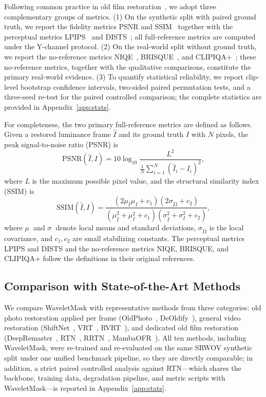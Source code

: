 \documentclass[applsci,article,submit,pdftex,moreauthors]{Definitions/mdpi}
\begin{document}
Following common practice in old film restoration~\cite{rtn2022,rrtn2024,mao2025mambaofr}, we adopt three complementary groups of metrics. (1) On the synthetic split with paired ground truth, we report the fidelity metrics PSNR and SSIM~\cite{wang2004ssim} together with the perceptual metrics LPIPS~\cite{zhang2018lpips} and DISTS~\cite{ding2020dists}; all full-reference metrics are computed under the Y-channel protocol. (2) On the real-world split without ground truth, we report the no-reference metrics NIQE~\cite{mittal2013niqe}, BRISQUE~\cite{mittal2012brisque}, and CLIPIQA+~\cite{wang2023clipiqa}; these no-reference metrics, together with the qualitative comparisons, constitute the primary real-world evidence. (3) To quantify statistical reliability, we report clip-level bootstrap confidence intervals, two-sided paired permutation tests, and a three-seed re-test for the paired controlled comparison; the complete statistics are provided in Appendix~\ref{app:stats}.

For completeness, the two primary full-reference metrics are defined as follows. Given a restored luminance frame $\hat{I}$ and its ground truth $I$ with $N$ pixels, the peak signal-to-noise ratio (PSNR) is
\begin{equation}
\mathrm{PSNR}(\hat{I}, I) = 10\log_{10}\frac{L^{2}}{\frac{1}{N}\sum_{i=1}^{N}(\hat{I}_{i}-I_{i})^{2}},
\end{equation}
where $L$ is the maximum possible pixel value, and the structural similarity index (SSIM) is
\begin{equation}
\mathrm{SSIM}(\hat{I}, I) = \frac{(2\mu_{\hat{I}}\mu_{I}+c_{1})(2\sigma_{\hat{I}I}+c_{2})}{(\mu_{\hat{I}}^{2}+\mu_{I}^{2}+c_{1})(\sigma_{\hat{I}}^{2}+\sigma_{I}^{2}+c_{2})},
\end{equation}
where $\mu_{\cdot}$ and $\sigma_{\cdot}$ denote local means and standard deviations, $\sigma_{\hat{I}I}$ is the local covariance, and $c_{1},c_{2}$ are small stabilizing constants. The perceptual metrics LPIPS and DISTS and the no-reference metrics NIQE, BRISQUE, and CLIPIQA+ follow the definitions in their original references.

\subsection{Comparison with State-of-the-Art Methods}\label{subsec:sota}

We compare WaveletMask with representative methods from three categories: old photo restoration applied per frame (OldPhoto~\cite{wan2020bringing}, DeOldify~\cite{jantic2019deoldify}), general video restoration (ShiftNet~\cite{li2023shiftnet}, VRT~\cite{liang2024vrt}, RVRT~\cite{liang2022rvrt}), and dedicated old film restoration (DeepRemaster~\cite{iizuka2019deepremaster}, RTN~\cite{rtn2022}, RRTN~\cite{rrtn2024}, MambaOFR~\cite{mao2025mambaofr}). All ten methods, including WaveletMask, were re-trained and re-evaluated on the same SRWOV synthetic split under one unified benchmark pipeline, so they are directly comparable; in addition, a strict paired controlled analysis against RTN---which shares the backbone, training data, degradation pipeline, and metric scripts with WaveletMask---is reported in Appendix~\ref{app:stats}.
\end{document}
